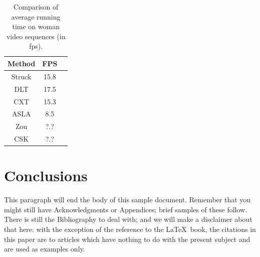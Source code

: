 \documentclass{acm_proc_article-sp}
\begin{document}
\begin{table}
	\centering
	\begin{tabular}{|c|c|l|} \hline
		Method & FPS\\ \hline
		Struck & 15.8\\ \hline
		DLT & 17.5\\ \hline
		CXT & 15.3\\ \hline
		ASLA & 8.5\\ \hline
		Zou & ?.?\\ \hline
		CSK & ?.?\\ \hline
	\end{tabular}
	\caption{Comparison of average running time on woman video sequences (in fps).}
\end{table}


\section{Conclusions}
This paragraph will end the body of this sample document.
Remember that you might still have Acknowledgments or
Appendices; brief samples of these
follow.  There is still the Bibliography to deal with; and
we will make a disclaimer about that here: with the exception
of the reference to the \LaTeX\ book, the citations in
this paper are to articles which have nothing to
do with the present subject and are used as
examples only.
\end{document}
